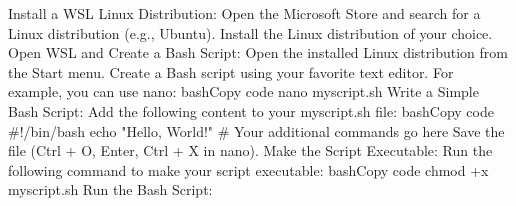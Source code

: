 \documentclass{article}%
\begin{document}
\newline%
\newline%
%
Install a WSL Linux Distribution:%
\newline%
\newline%
%
Open the Microsoft Store and search for a Linux distribution (e.g., Ubuntu).%
\newline%
\newline%
%
Install the Linux distribution of your choice.%
\newline%
\newline%
%
Open WSL and Create a Bash Script:%
\newline%
\newline%
%
Open the installed Linux distribution from the Start menu.%
\newline%
\newline%
%
Create a Bash script using your favorite text editor. For example, you can use nano:%
\newline%
\newline%
%
bashCopy code%
\newline%
\newline%
%
nano myscript.sh %
\newline%
\newline%
%
Write a Simple Bash Script:%
\newline%
\newline%
%
Add the following content to your myscript.sh file:%
\newline%
\newline%
%
bashCopy code%
\newline%
\newline%
%
\#!/bin/bash echo "Hello, World!" \# Your additional commands go here %
\newline%
\newline%
%
Save the file (Ctrl + O, Enter, Ctrl + X in nano).%
\newline%
\newline%
%
Make the Script Executable:%
\newline%
\newline%
%
Run the following command to make your script executable:%
\newline%
\newline%
%
bashCopy code%
\newline%
\newline%
%
chmod +x myscript.sh %
\newline%
\newline%
%
Run the Bash Script:%
\newline%
\end{document}
